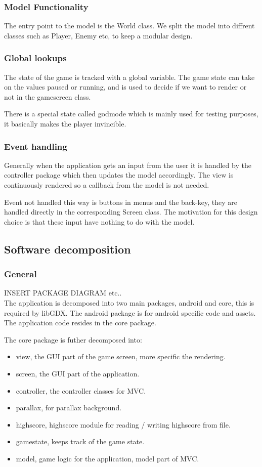 \documentclass{article}
\begin{document}
\subsubsection{Model Functionality}
The entry point to the model is the World class. We split the model into diffrent classes such as Player, Enemy etc, to keep a modular design.

\subsubsection{Global lookups}
The state of the game is tracked with a global variable. The game state can take on the values paused or running, and is used to decide if we want to render or not in the gamescreen class.

There is a special state called godmode which is mainly used for testing purposes, it basically makes the player invincible.
	
\subsubsection{Event handling}
Generally when the application gets an input from the user it is handled by the controller package which then updates the model accordingly. The view is continuously rendered so a callback from the model is not needed.

Event not handled this way is buttons in menus and the back-key, they are handled directly in the corresponding Screen class. The motivation for this design choice is that these input have nothing to do with the model.

\subsection{Software decomposition}
\subsubsection{General}
INSERT PACKAGE DIAGRAM etc.. \\
The application is decomposed into two main packages, android and core, this is required by libGDX. The android package is for android specific code and assets. The application code resides in the core package.

The core package is futher decomposed into:
\begin{itemize}
  \item view, the GUI part of the game screen, more specific the rendering.
  \item screen, the GUI part of the application.
  \item controller, the controller classes for MVC.
  \item parallax, for parallax background.
  \item highscore, highscore module for reading / writing highscore from file.
  \item gamestate, keeps track of the game state.
  \item model, game logic for the application, model part of MVC.
\end{itemize}
\end{document}
